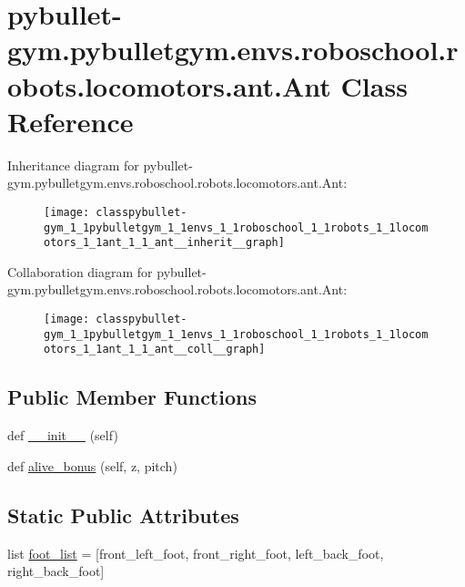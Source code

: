 \hypertarget{classpybullet-gym_1_1pybulletgym_1_1envs_1_1roboschool_1_1robots_1_1locomotors_1_1ant_1_1_ant}{}\section{pybullet-\/gym.pybulletgym.\+envs.\+roboschool.\+robots.\+locomotors.\+ant.\+Ant Class Reference}
\label{classpybullet-gym_1_1pybulletgym_1_1envs_1_1roboschool_1_1robots_1_1locomotors_1_1ant_1_1_ant}


Inheritance diagram for pybullet-\/gym.pybulletgym.\+envs.\+roboschool.\+robots.\+locomotors.\+ant.\+Ant\+:
\nopagebreak
\begin{figure}[H]
\begin{center}
\leavevmode
\texttt{[image: classpybullet-gym\_1\_1pybulletgym\_1\_1envs\_1\_1roboschool\_1\_1robots\_1\_1locomotors\_1\_1ant\_1\_1\_ant\_\_inherit\_\_graph]}
\end{center}
\end{figure}


Collaboration diagram for pybullet-\/gym.pybulletgym.\+envs.\+roboschool.\+robots.\+locomotors.\+ant.\+Ant\+:
\nopagebreak
\begin{figure}[H]
\begin{center}
\leavevmode
\texttt{[image: classpybullet-gym\_1\_1pybulletgym\_1\_1envs\_1\_1roboschool\_1\_1robots\_1\_1locomotors\_1\_1ant\_1\_1\_ant\_\_coll\_\_graph]}
\end{center}
\end{figure}
\subsection*{Public Member Functions}
\begin{DoxyCompactItemize}
\item 
def \hyperlink{classpybullet-gym_1_1pybulletgym_1_1envs_1_1roboschool_1_1robots_1_1locomotors_1_1ant_1_1_ant_a8a17ef76f16121ba7343d59766274599}{\+\_\+\+\_\+init\+\_\+\+\_\+} (self)
\item 
def \hyperlink{classpybullet-gym_1_1pybulletgym_1_1envs_1_1roboschool_1_1robots_1_1locomotors_1_1ant_1_1_ant_a2e48db858419d62a9fb39381be5a1732}{alive\+\_\+bonus} (self, z, pitch)
\end{DoxyCompactItemize}
\subsection*{Static Public Attributes}
\begin{DoxyCompactItemize}
\item 
list \hyperlink{classpybullet-gym_1_1pybulletgym_1_1envs_1_1roboschool_1_1robots_1_1locomotors_1_1ant_1_1_ant_a3ab9cb3a5cb46dd858aa031a3c63cd7d}{foot\+\_\+list} = \mbox{[}\textquotesingle{}front\+\_\+left\+\_\+foot\textquotesingle{}, \textquotesingle{}front\+\_\+right\+\_\+foot\textquotesingle{}, \textquotesingle{}left\+\_\+back\+\_\+foot\textquotesingle{}, \textquotesingle{}right\+\_\+back\+\_\+foot\textquotesingle{}\mbox{]}
\end{DoxyCompactItemize}



